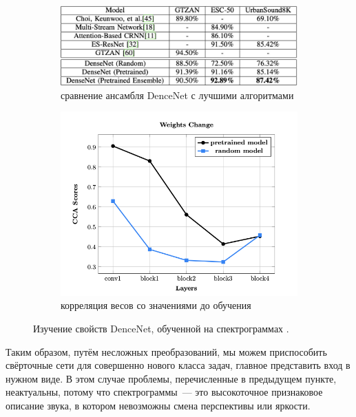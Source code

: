 \documentclass[12pt, fleqn]{article}
\begin{document}
    \begin{figure}[ht]
        \centering
        \begin{subfigure}[b]{0.6\textwidth}
            \includegraphics[width=\linewidth]{pics/sound_scores.png}
            \caption{сравнение ансамбля DenceNet с лучшими алгоритмами}
        \end{subfigure}
        \begin{subfigure}[b]{0.4\textwidth}
            \includegraphics[width=\linewidth]{pics/sound_weights.png}
            \caption{корреляция весов со значениями до обучения}
        \end{subfigure}
        \caption{Изучение свойств DenceNet, обученной на спектрограммах \cite{palanisamy2020rethinking}.}
        \label{sound_res}
    \end{figure}  

    Таким образом, путём несложных преобразований, мы можем приспособить свёрточные сети для совершенно нового класса задач, главное 
    представить вход в нужном виде. В этом случае проблемы, перечисленные в предыдущем пункте, неактуальны, потому что спектрограммы~--- 
    это высокоточное признаковое описание звука, в котором невозможны смена перспективы или яркости.
\end{document}
